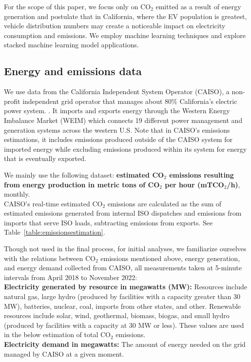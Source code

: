 \documentclass{article}
\begin{document}
For the scope of this paper, we focus only on CO\(_2\) emitted as a result of energy generation and postulate that in California, where the EV population is greatest, vehicle distribution numbers may create a noticeable impact on electricity consumption and emissions. We employ machine learning techniques and explore stacked machine learning model applications.


\subsection{Energy and emissions data} \label{energyemissionsdata}

We use data from the California Independent System Operator (CAISO), a non-profit independent grid operator that manages about 80\% California's electric power system. \citep{caiso:bg}. It imports and exports energy through the Western Energy Imbalance Market (WEIM) which connects 19 different power management and generation systems across the western U.S. \citep{weim:bg} Note that in CAISO's emissions estimations, it includes emissions produced outside of the CAISO system for imported energy while excluding emissions produced within its system for energy that is eventually exported.

We mainly use the following dataset: \textbf{estimated CO\(_2\) emissions resulting from energy production in metric tons of CO\(_2\) per hour (mTCO\(_2\)/h)}, monthly.\\
CAISO's real-time estimated CO\(_2\) emissions are calculated as the sum of estimated emissions generated from internal ISO dispatches and emissions from imports that serve ISO loads, subtracting emissions from exports. \citep{caiso:ghgmethod} See Table~\ref{table:emissionsestimation}.

Though not used in the final process, for initial analyses, we familiarize ourselves with the relations between CO\(_2\) emissions mentioned above, energy generation, and energy demand collected from CAISO, all measurements taken at 5-minute intervals from April 2018 to November 2022: \citep{caiso:energyemissionsdata}\\
\textbf{Electricity generated by resource in megawatts (MW):} Resources include natural gas, large hydro (produced by facilities with a capacity greater than 30 MW), batteries, nuclear, coal, imports from other states, and other. Renewable resources include solar, wind, geothermal, biomass, biogas, and small hydro (produced by facilities with a capacity at 30 MW or less). These values are used in the below estimation of total CO\(_2\) emissions.\\
\textbf{Electricity demand in megawatts:} The amount of energy needed on the grid managed by CAISO at a given moment.
\end{document}
